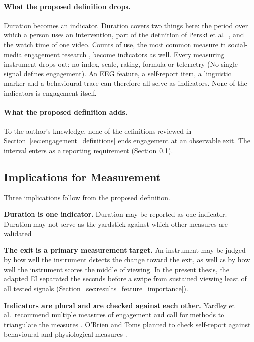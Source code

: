 \documentclass[12pt,a4paper]{report}
\begin{document}
\paragraph{What the proposed definition drops.} Duration becomes an indicator. Duration covers two things here: the period over which a person uses an intervention, part of the definition of Perski et al.\ \cite{perski_conceptualising_2017}, and the watch time of one video. Counts of use, the most common measure in social-media engagement research \cite{trunfio_conceptualising_2021}, become indicators as well. Every measuring instrument drops out: no index, scale, rating, formula or telemetry (No single signal defines engagement). An EEG feature, a self-report item, a linguistic marker and a behavioural trace can therefore all serve as indicators. None of the indicators is engagement itself.

\paragraph{What the proposed definition adds.} To the author's knowledge, none of the definitions reviewed in Section~\ref{sec:engagement_definitions} ends engagement at an observable exit. The interval enters as a reporting requirement (Section~\ref{sec:engagement_measurement}).

\subsection{Implications for Measurement}
\label{sec:engagement_measurement}

Three implications follow from the proposed definition.

\textbf{Duration is one indicator.} Duration may be reported as one indicator. Duration may not serve as the yardstick against which other measures are validated.

\textbf{The exit is a primary measurement target.} An instrument may be judged by how well the instrument detects the change toward the exit, as well as by how well the instrument scores the middle of viewing. In the present thesis, the adapted EI separated the seconds before a swipe from sustained viewing least of all tested signals (Section~\ref{sec:results_feature_importance}).

\textbf{Indicators are plural and are checked against each other.} Yardley et al.\ recommend multiple measures of engagement and call for methods to triangulate the measures \cite{yardley_understanding_2016}. O'Brien and Toms planned to check self-report against behavioural and physiological measures \cite{obrien_what_2008}.
\end{document}

